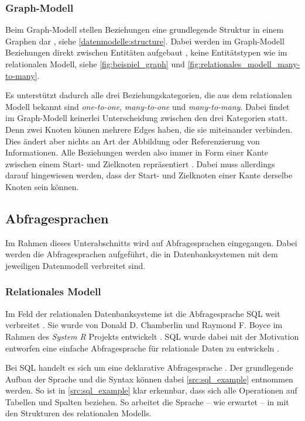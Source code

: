 \subsubsection{Graph-Modell}
Beim Graph-Modell stellen Beziehungen eine grundlegende Struktur in einem Graphen dar \cite{gdbms}, siehe \autoref{datenmodelle:structure}. Dabei werden im Graph-Modell Beziehungen direkt zwischen Entitäten aufgebaut \cite{gdbms}, keine Entitätstypen wie im relationalen Modell, siehe \autoref{fig:beispiel_graph} und \autoref{fig:relationales_modell_many-to-many}.

Es unterstützt dadurch alle drei Beziehungskategorien, die aus dem relationalen Modell bekannt sind \textit{one-to-one}, \textit{many-to-one} und \textit{many-to-many}. Dabei findet im Graph-Modell keinerlei Unterscheidung zwischen den drei Kategorien statt. Denn zwei Knoten können mehrere Edges haben, die sie miteinander verbinden. Dies ändert aber nichts an Art der Abbildung oder Referenzierung von Informationen. Alle Beziehungen werden also immer in Form einer Kante zwischen einem Start- und Zielknoten repräsentiert \cite{gdbms}. Dabei muss allerdings darauf hingewiesen werden, dass der Start- und Zielknoten einer Kante derselbe Knoten sein können.

\subsection{Abfragesprachen}
Im Rahmen dieses Unterabschnitts wird auf Abfragesprachen eingegangen. Dabei werden die Abfragesprachen aufgeführt, die in Datenbanksystemen mit dem jeweiligen Datenmodell verbreitet sind.

\subsubsection{Relationales Modell}
Im Feld der relationalen Datenbanksysteme ist die Abfragesprache SQL weit verbreitet \cite{sql_history}. Sie wurde von Donald D. Chamberlin und Raymond F. Boyce im Rahmen des \textit{System R} Projekts entwickelt \cite{sql_history}. SQL wurde dabei mit der Motivation entworfen eine einfache Abfragesprache für relationale Daten zu entwickeln \cite{sql_history}. 

Bei SQL handelt es sich um eine deklarative Abfragesprache \cite{sql_history}. Der grundlegende Aufbau der Sprache und die Syntax können dabei \autoref{src:sql_example} entnommen werden. So ist in \autoref{src:sql_example} klar erkennbar, dass sich alle Operationen auf Tabellen und Spalten beziehen. So arbeitet die Sprache -- wie erwartet -- in mit den Strukturen des relationalen Modells.

